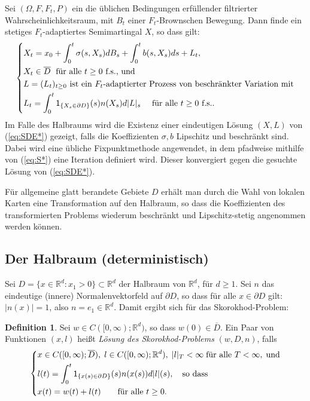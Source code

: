 \documentclass[10pt, a4paper, leqno, twoside, bibliography=totocnumbered, final]{scrartcl}
\theoremstyle{definition}
\newtheorem{defin}{Definition}[section]
\theoremstyle{plain}%
\theoremstyle{remark}
\begin{document}
Sei $ (\Omega, F, F_t , P) $ ein die üblichen Bedingungen erfüllender filtrierter Wahrscheinlichkeitsraum, mit $ B_t $ einer $F_t$-Brownschen Bewegung. Dann finde ein stetiges $F_t$-adaptiertes Semimartingal $X$, so dass gilt:
\begin{equation}
\label{eq:SDE*}
\left \{ \begin{aligned}
& X_{t} = x_{0} + \int_{0}^{t} \sigma (s, X_{s}) dB_{s} + \int_0^t b(s,X_{s})ds + L_{t}, \\ 
& X_{t} \in \overline{D} \; \text{ für alle $ t \geq 0 $ f.s., und} \\ 
& \text{$ L = (L_{t})_{t \geq 0} $ ist ein $ F_t $-adaptierter Prozess von beschränkter Variation mit} \\
& L_{t} = \int_{0}^{t} \mathsf{1}_{\{X_{s} \in \partial D \} }(s) n(X_{s}) d|L|_{s} \quad \text{ für alle $ t \geq 0 $ f.s..}
\end{aligned}  \right .
\end{equation}
Im Falle des Halbraums wird die Existenz einer eindeutigen Lösung $(X,L)$ von (\ref{eq:SDE*}) gezeigt, falls die Koeffizienten $ \sigma, b $ Lipschitz und beschränkt sind. Dabei wird eine übliche Fixpunktmethode angewendet, in dem pfadweise mithilfe von (\ref{eq:S*}) eine Iteration definiert wird. Dieser konvergiert gegen die gesuchte Lösung von (\ref{eq:SDE*}).

Für allgemeine glatt berandete Gebiete $D$ erhält man durch die  Wahl von lokalen Karten eine Transformation auf den Halbraum, so dass die Koeffizienten des transformierten Problems wiederum beschränkt und Lipschitz-stetig angenommen werden können.

\subsection{Der Halbraum (deterministisch)}

Sei $ D = \{ x \in \mathbb{R}^d : x_1 > 0 \} \subset \mathbb{R}^d $ der Halbraum von $ \mathbb{R}^d $, für $ d \geq 1 $. Sei $n$ das eindeutige (innere) Normalenvektorfeld auf $ \partial D $, so dass für alle $ x \in \partial D $ gilt: $ |n(x)| = 1 $, also $ n = e_1 \in \mathbb{R}^d $. Damit ergibt sich für das Skorokhod-Problem:

\begin{defin}
Sei $ w \in C([0, \infty); \mathbb{R}^d) $, so dass $ w(0) \in \overline{D} $. Ein Paar von Funktionen $(x,l)$ heißt \emph{Lösung des Skorokhod-Problems} $ (w, D, n) $, falls
\begin{equation}
\label{eq:S}
\left \{ \begin{aligned}
& x \in C([0, \infty); \overline{D}), \; l \in C([0, \infty); \mathbb{R}^d), \; |l|_T < \infty \; \text{für alle } T < \infty, \; \text{und} \\  
& l(t) = \int_0^t \mathsf{1}_{\{ x(s) \in \partial D \} }(s) n(x(s)) d|l|(s), \quad \text{so dass} \\
& x(t) = w(t) + l(t) \qquad \text{für alle $ t \geq 0 $}.
\end{aligned} \right .
\end{equation}
\end{defin}
\end{document}
